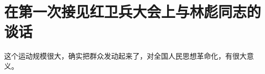 \section[在第一次接见红卫兵大会上与林彪同志的谈话（一九六六年八月十八日）]{在第一次接见红卫兵大会上与林彪同志的谈话}


这个运动规模很大，确实把群众发动起来了，对全国人民思想革命化，有很大意义。

